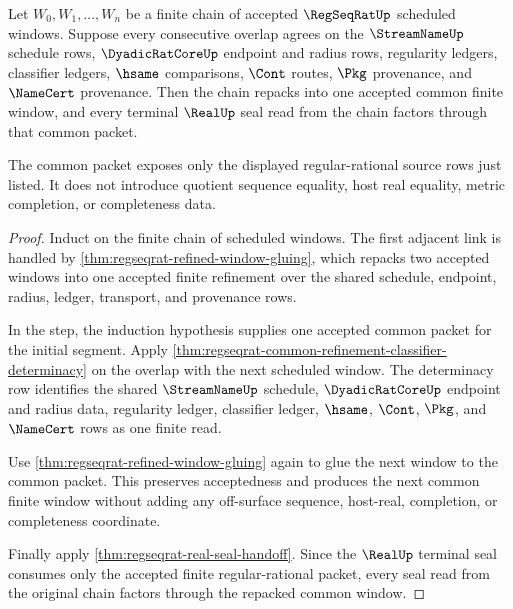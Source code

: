 \begin{theorem}
\label{thm:regseqrat-refined-window-chain-exhaustion}
Let $W_0,W_1,\ldots,W_n$ be a finite chain of accepted $\RegSeqRatUp$
scheduled windows. Suppose every consecutive overlap agrees on the
$\StreamNameUp$ schedule rows, $\DyadicRatCoreUp$ endpoint and radius rows,
regularity ledgers, classifier ledgers, $\hsame$ comparisons, $\Cont$ routes,
$\Pkg$ provenance, and $\NameCert$ provenance. Then the chain repacks into one
accepted common finite window, and every terminal $\RealUp$ seal read from the
chain factors through that common packet.

The common packet exposes only the displayed regular-rational source rows just
listed. It does not introduce quotient sequence equality, host real equality,
metric completion, or completeness data.
\end{theorem}
\begin{proof}
Induct on the finite chain of scheduled windows. The first adjacent link is
handled by \autoref{thm:regseqrat-refined-window-gluing}, which repacks two
accepted windows into one accepted finite refinement over the shared schedule,
endpoint, radius, ledger, transport, and provenance rows.

In the step, the induction hypothesis supplies one accepted common packet for
the initial segment. Apply
\autoref{thm:regseqrat-common-refinement-classifier-determinacy} on the overlap
with the next scheduled window. The determinacy row identifies the shared
$\StreamNameUp$ schedule, $\DyadicRatCoreUp$ endpoint and radius data,
regularity ledger, classifier ledger, $\hsame$, $\Cont$, $\Pkg$, and
$\NameCert$ rows as one finite read.

Use \autoref{thm:regseqrat-refined-window-gluing} again to glue the next window
to the common packet. This preserves acceptedness and produces the next common
finite window without adding any off-surface sequence, host-real, completion,
or completeness coordinate.

Finally apply \autoref{thm:regseqrat-real-seal-handoff}. Since the $\RealUp$
terminal seal consumes only the accepted finite regular-rational packet, every
seal read from the original chain factors through the repacked common window.
\end{proof}

